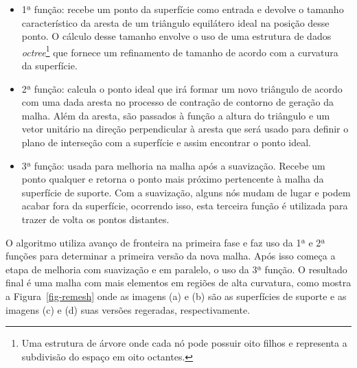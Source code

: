 \renewcommand{\labelitemi}{•}
\begin{itemize}
  \item 1ª função: recebe um ponto da superfície como entrada e devolve o tamanho característico da aresta de um triângulo equilátero ideal na posição desse ponto. O cálculo desse tamanho envolve o uso de uma estrutura de dados \textit{octree}\footnote{Uma estrutura de árvore onde cada nó pode possuir oito filhos e representa a subdivisão do espaço em oito octantes\cite{Donald}.} que fornece um refinamento de tamanho de acordo com a curvatura da superfície.
  \item 2ª função: calcula o ponto ideal que irá formar um novo triângulo de acordo com uma dada aresta no processo de contração de contorno de geração da malha. Além da aresta, são passados à função a altura do triângulo e um vetor unitário na direção perpendicular à aresta que será usado para definir o plano de interseção com a superfície e assim encontrar o ponto ideal.
  \item 3ª função: usada para melhoria na malha após a suavização. Recebe um ponto qualquer e retorna o ponto mais próximo pertencente à malha da superfície de suporte. Com a suavização, alguns nós mudam de lugar e podem acabar fora da superfície, ocorrendo isso, esta terceira função é utilizada para trazer de volta os pontos distantes. 
\end{itemize}

O algoritmo utiliza avanço de fronteira na primeira fase e faz uso da 1ª e 2ª funções para determinar a primeira versão da nova malha. Após isso começa a etapa de melhoria com suavização e em paralelo, o uso da 3ª função\cite{Miranda}. O resultado final é uma malha com mais elementos em regiões de alta curvatura, como mostra a Figura~\ref{fig-remesh} onde as imagens (a) e (b) são as superfícies de suporte e as imagens (c) e (d) suas versões regeradas, respectivamente.

